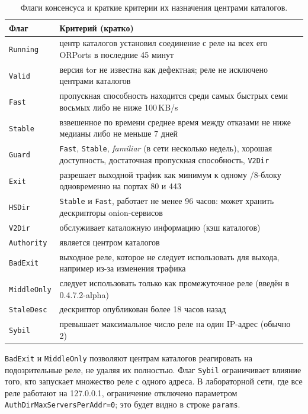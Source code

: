 \begin{table}[htbp]
\centering\small
\begin{tabularx}{\textwidth}{@{}l>{\raggedright\arraybackslash}X@{}}
\toprule
Флаг & Критерий (кратко) \\
\midrule
\texttt{Running} & центр каталогов установил соединение с реле на всех его ORPorts в последние 45 минут \\
\texttt{Valid} & версия tor не известна как дефектная; реле не исключено центрами каталогов \\
\texttt{Fast} & пропускная способность находится среди самых быстрых семи восьмых либо не ниже 100\,KB/s \\
\texttt{Stable} & взвешенное по времени среднее время между отказами не ниже медианы либо не меньше 7 дней \\
\texttt{Guard} & \texttt{Fast}, \texttt{Stable}, \emph{familiar} (в сети несколько недель), хорошая доступность, достаточная пропускная способность, \texttt{V2Dir} \\
\texttt{Exit} & разрешает выходной трафик как минимум к одному /8-блоку одновременно на портах 80 и 443 \\
\texttt{HSDir} & \texttt{Stable} и \texttt{Fast}, работает не менее 96 часов: может хранить дескрипторы onion-сервисов \\
\texttt{V2Dir} & обслуживает каталожную информацию (кэш каталогов) \\
\texttt{Authority} & является центром каталогов \\
\texttt{BadExit} & выходное реле, которое не следует использовать для выхода, например из-за изменения трафика \\
\texttt{MiddleOnly} & следует использовать только как промежуточное реле (введён в 0.4.7.2-alpha) \\
\texttt{StaleDesc} & дескриптор опубликован более 18 часов назад \\
\texttt{Sybil} & превышает максимальное число реле на один IP-адрес (обычно 2) \\
\bottomrule
\end{tabularx}
\caption{Флаги консенсуса и краткие критерии их назначения центрами каталогов.}
\label{tab:flag}
\end{table}

\texttt{BadExit} и \texttt{MiddleOnly} позволяют центрам каталогов реагировать на подозрительные реле, не удаляя их полностью. Флаг \texttt{Sybil} ограничивает влияние того, кто запускает множество реле с одного адреса. В лабораторной сети, где все реле работают на 127.0.0.1, ограничение отключено параметром \texttt{AuthDirMaxServersPerAddr=0}; это будет видно в строке \texttt{params}.

